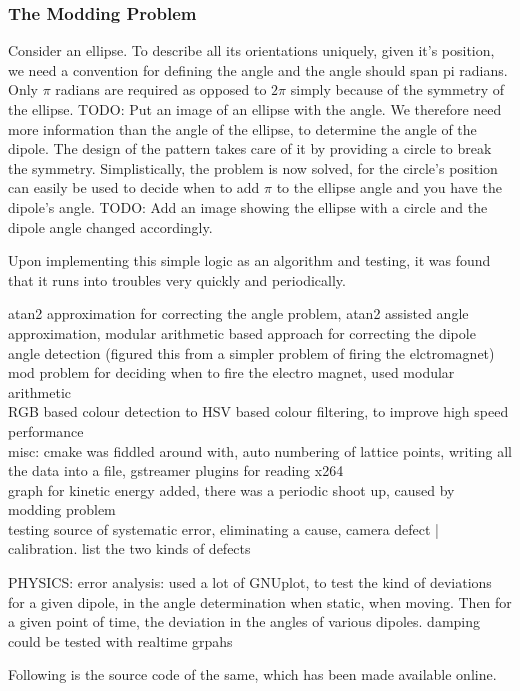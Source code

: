 		\subsubsection{The Modding Problem}
			Consider an ellipse. To describe all its orientations uniquely, given it's position, we need a convention for defining the angle and the angle should span pi radians. Only $\pi$ radians are required as opposed to $2\pi$ simply because of the symmetry of the ellipse. TODO: Put an image of an ellipse with the angle. We therefore need more information than the angle of the ellipse, to determine the angle of the dipole. The design of the pattern takes care of it by providing a circle to break the symmetry. Simplistically, the problem is now solved, for the circle's position can easily be used to decide when to add $\pi$ to the ellipse angle and you have the dipole's angle. TODO: Add an image showing the ellipse with a circle and the dipole angle changed accordingly.
			\par
			Upon implementing this simple logic as an algorithm and testing, it was found that it runs into troubles very quickly and periodically.
			\par
			atan2 approximation for correcting the angle problem, atan2 assisted angle approximation, modular arithmetic based approach for correcting the dipole angle detection (figured this from a simpler problem of firing the elctromagnet)
		\\
		mod problem for deciding when to fire the electro magnet, used modular arithmetic
		\\
		RGB based colour detection to HSV based colour filtering, to improve high speed performance
		\\
		misc: cmake was fiddled around with, auto numbering of lattice points, writing all the data into a file, gstreamer plugins for reading x264
		\\
		graph for kinetic energy added, there was a periodic shoot up, caused by modding problem
		\\
		testing source of systematic error, eliminating a cause, camera defect | calibration. list the two kinds of defects
		\par				
		PHYSICS:
		error analysis: used a lot of GNUplot, to test the kind of deviations for a given dipole, in the angle determination when static, when moving. Then for a given point of time, the deviation in the angles of various dipoles. damping could be tested with realtime grpahs

		Following is the source code of the same, which has been made available online.
		

